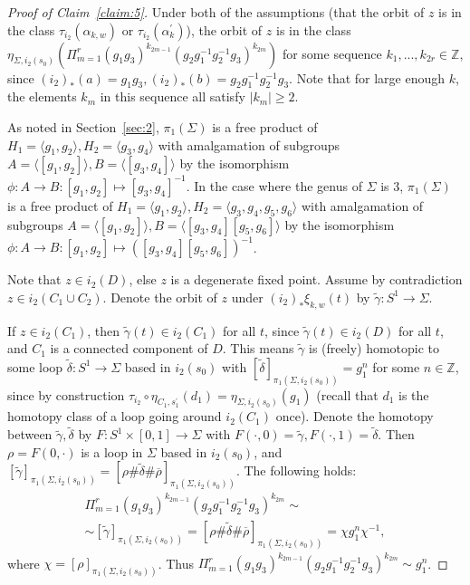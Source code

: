 \documentclass[11pt]{article}
\newenvironment{myequation}
    {
        \begin{equation*}
        \begin{gathered}
    }
    { 
        \end{gathered} 
        \end{equation*}
    }
\newcommand{\Z}{\mathbb{Z}}
\begin{document}
            \begin{proof}[Proof of Claim~\ref{claim:5}]
                Under both of the assumptions (that the orbit of $z$ is in the class $\tau_{i_2}(\alpha_{k,w})$ or $\tau_{i_2}(\alpha_k^\prime)$), the orbit of $z$ is in the class $\eta_{\Sigma, i_2(s_0)}(\Pi_{m=1}^r (g_1 g_3)^{k_{2m-1}} (g_2 g_1^{-1} g_2^{-1} g_3)^{k_{2m}})$ for some sequence $k_1,...,k_{2r} \in \Z$, since $(i_2)_*(a) = g_1 g_3, (i_2)_*(b) = g_2 g_1^{-1} g_2^{-1} g_3$. Note that for large enough $k$, the elements $k_m$ in this sequence all satisfy $|k_m| \geq 2$.
                
                As noted in Section~\ref{sec:2}, $\pi_1(\Sigma)$ is a free product of $H_1 = \langle g_1,g_2 \rangle, H_2 = \langle g_3,g_4 \rangle$ with amalgamation of subgroups $A = \langle [g_1,g_2] \rangle, B = \langle [g_3,g_4] \rangle$ by the isomorphism $\phi: A \to B: [g_1,g_2] \mapsto [g_3,g_4]^{-1}$. In the case where the genus of $\Sigma$ is 3, $\pi_1(\Sigma)$ is a free product of $H_1 = \langle g_1,g_2 \rangle, H_2 = \langle g_3,g_4,g_5,g_6 \rangle$ with amalgamation of subgroups $A = \langle [g_1,g_2] \rangle, B = \langle [g_3,g_4][g_5,g_6] \rangle$ by the isomorphism $\phi : A \to B : [g_1,g_2] \mapsto ([g_3,g_4][g_5,g_6])^{-1}$.
                
                Note that $z \in i_2(D)$, else $z$ is a degenerate fixed point. Assume by contradiction $z \in i_2(C_1 \cup C_2)$. Denote the orbit of $z$ under $(i_2)_* \xi_{k,w}(t)$ by $\tilde{\gamma}: S^1 \to \Sigma$. 
                
                If $z \in i_2(C_1)$, then $\tilde{\gamma}(t) \in i_2(C_1)$ for all $t$, since $\tilde{\gamma}(t) \in i_2(D)$ for all $t$, and $C_1$ is a connected component of $D$. This means $\tilde{\gamma}$ is (freely) homotopic to some loop $\tilde{\delta}: S^1 \to \Sigma$ based in $i_2(s_0)$ with $[\tilde{\delta}]_{\pi_1(\Sigma,i_2(s_0))} = g_1^n$ for some $n \in \Z$, since by construction $\tau_{i_2} \circ \eta_{C_1, s_1^\prime} (d_1) = \eta_{\Sigma,i_2(s_0)} (g_1)$ (recall that $d_1$ is the homotopy class of a loop going around $i_2(C_1)$ once). Denote the homotopy between $\tilde{\gamma},\tilde{\delta}$ by $F : S^1 \times [0,1] \to \Sigma$ with $F(\cdot,0) = \tilde{\gamma}, F(\cdot, 1) = \tilde{\delta}$. Then $\rho = F(0, \cdot)$ is a loop in $\Sigma$ based in $i_2(s_0)$, and $[\tilde{\gamma}]_{\pi_1(\Sigma,i_2(s_0))} = [\rho \# \tilde{\delta} \# \overline{\rho}]_{\pi_1(\Sigma, i_2(s_0))}$. The following holds:
                \begin{myequation}
                    \Pi_{m=1}^r (g_1 g_3)^{k_{2m-1}} (g_2 g_1^{-1} g_2^{-1}g_3)^{k_{2m}} \sim \\
                    \sim [\tilde{\gamma}]_{\pi_1(\Sigma, i_2(s_0))} = [\rho \# \tilde{\delta} \# \overline{\rho}]_{\pi_1(\Sigma, i_2(s_0))} = \chi g_1^n \chi^{-1} ,
                \end{myequation}
                where $\chi = [\rho]_{\pi_1(\Sigma, i_2(s_0))}$. Thus $\Pi_{m=1}^r (g_1 g_3)^{k_{2m-1}} (g_2 g_1^{-1} g_2^{-1}g_3)^{k_{2m}} \sim g_1^n$.
                

\end{proof}
\end{document}

